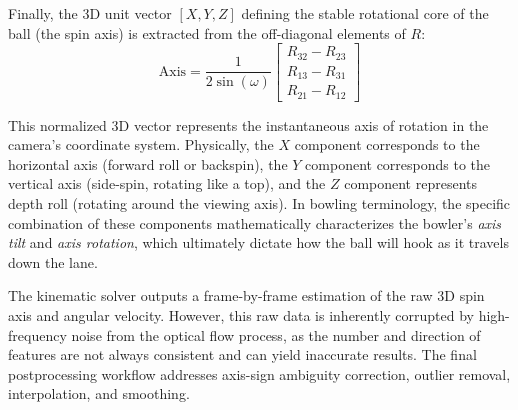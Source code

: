 Finally, the 3D unit vector $[X, Y, Z]$ defining the stable rotational core of the ball (the spin axis) is extracted from the off-diagonal elements of $R$:
\begin{equation}
    \text{Axis} = \frac{1}{2 \sin(\omega)}
    \begin{bmatrix}
        R_{32} - R_{23} \\
        R_{13} - R_{31} \\
        R_{21} - R_{12}
    \end{bmatrix}
\end{equation}

This normalized 3D vector represents the instantaneous axis of rotation in the camera's coordinate system. Physically, the $X$ component corresponds to the horizontal axis (forward roll or backspin), the $Y$ component corresponds to the vertical axis (side-spin, rotating like a top), and the $Z$ component represents depth roll (rotating around the viewing axis). In bowling terminology, the specific combination of these components mathematically characterizes the bowler's \emph{axis tilt} and \emph{axis rotation}, which ultimately dictate how the ball will hook as it travels down the lane.

The kinematic solver outputs a frame-by-frame estimation of the raw 3D spin axis and angular velocity. However, this raw data is inherently corrupted by high-frequency noise from the optical flow process, as the number and direction of features are not always consistent and can yield inaccurate results. The final postprocessing workflow addresses axis-sign ambiguity correction, outlier removal, interpolation, and smoothing.